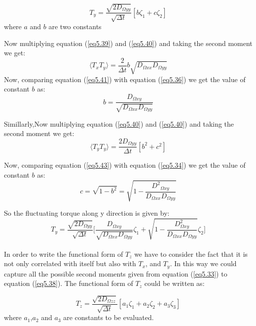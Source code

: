 \begin{equation}
	\label{eq5.40}
	T_y=\frac{\sqrt{2D_{\Omega{yy}}}}{\sqrt{\Delta t}}[b\zeta_1+c\zeta_2]
\end{equation}
where $a$ and $b$ are two constants

Now multiplying equation (\ref{eq5.39}) and (\ref{eq5.40}) and taking the second moment we get:
\begin{equation}
	\label{eq5.41}
	\langle T_x T_y\rangle=\frac{2}{\Delta t}b\sqrt{D_{\Omega{xx}}D_{\Omega{yy}}}
\end{equation} 
Now, comparing equation (\ref{eq5.41}) with equation (\ref{eq5.36}) we get the value of constant $b$ as:
\begin{equation}
	\label{eq5.42}
	b=\frac{D_{\Omega{xy}}}{\sqrt{D_{\Omega{xx}}D_{\Omega{yy}}}}
\end{equation} 

Simillarly,Now multiplying equation (\ref{eq5.40}) and (\ref{eq5.40}) and taking the second moment we get:
\begin{equation}
	\label{eq5.43}
	\langle T_y T_y\rangle=\frac{2D_{\Omega{yy}}}{\Delta t}[b^2+c^2]
\end{equation}

Now, comparing equation (\ref{eq5.43}) with equation (\ref{eq5.34}) we get the value of constant $b$ as:
\begin{equation}
	\label{eq5.44}
	c=\sqrt{1-b^2}=\sqrt{1-\frac{{D^2}_{\Omega{xy}}}{D_{\Omega{xx}}D_{\Omega{yy}}}}
\end{equation}

So the fluctuating torque along y direction is given by:
\begin{equation}
	\label{eq5.45}
	T_y=\frac{\sqrt{2D_{\Omega{yy}}}}{\sqrt{\Delta t}}\Bigg[\frac{D_{\Omega{xy}}}{\sqrt{D_{\Omega{xx}}D_{\Omega{yy}}}}\zeta_1+ \sqrt{1-\frac{D_{\Omega{xy}}^2}{D_{\Omega{xx}}D_{\Omega{yy}}}}\zeta_2\Bigg]
\end{equation}\\

In order to write the functional form of $T_z$ we have to consider the fact that it is not only correlated with itself but also with $T_x$, and $T_y$. In this way we could capture all the possible second moments given from equation (\ref{eq5.33}) to equation (\ref{eq5.38}).
The functional form of $T_z$ could be written as:

\begin{equation}
	\label{eq5.46}
	T_z=\frac{\sqrt{2D_{\Omega{zz}}}}{\sqrt{\Delta t}}[a_1\zeta_1+a_2\zeta_2+a_3\zeta_3]
\end{equation}
where $a_1$,$a_2$ and $a_3$ are constants to be evaluated.

